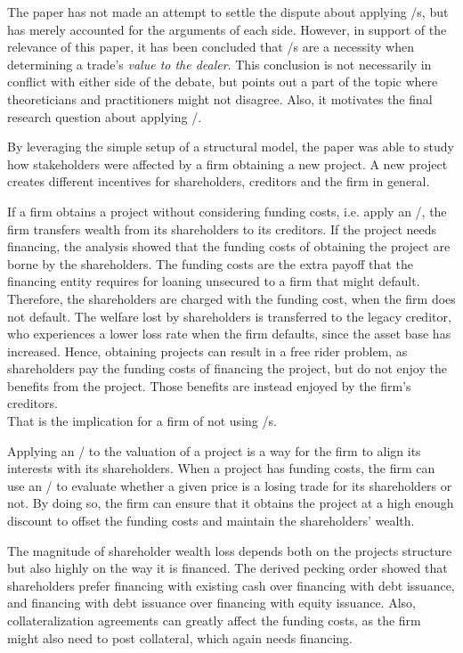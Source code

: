 \documentclass[main.tex]{subfiles}
\begin{document}
    The paper has not made an attempt to settle the dispute about applying \FVA/s,
    but has merely accounted for the arguments of each side.
    However, in support of the relevance of this paper,
    it has been concluded that \FVA/s are a necessity 
    when determining a trade's \textit{value to the dealer}.
    This conclusion is not necessarily in conflict with either side of the debate,
    but points out a part of the topic where theoreticians and practitioners might not disagree.
    Also, it motivates the final research question about applying \FVA/.

    \textbf{\researchQuestionFvaImplications}
    By leveraging the simple setup of a structural model,
    the paper was able to study how stakeholders were affected by a firm obtaining a new project.
    A new project creates different incentives for shareholders, creditors and the firm in general.

    If a firm obtains a project without considering funding costs, i.e. apply an \FVA/,
    the firm transfers wealth from its shareholders to its creditors.
    If the project needs financing, 
    the analysis showed that the funding costs 
    of obtaining the project are borne by the shareholders.
    The funding costs are the extra payoff that the financing entity requires
    for loaning unsecured to a firm that might default.
    Therefore, the shareholders are charged with the funding cost, when the firm does not default.
    The welfare lost by shareholders is transferred to the legacy creditor,
    who experiences a lower loss rate when the firm defaults, since the asset base has increased.
    Hence, obtaining projects can result in a free rider problem, 
    as shareholders pay the funding costs of financing the project,
    but do not enjoy the benefits from the project.
    Those benefits are instead enjoyed by the firm's creditors. \\
    That is the implication for a firm of not using \FVA/s.

    Applying an \FVA/ to the valuation of a project is a way for the firm 
    to align its interests with its shareholders.
    When a project has funding costs,
    the firm can use an \FVA/ to evaluate
    whether a given price is a losing trade for its shareholders or not.
    By doing so, the firm can ensure that it obtains the project at a high enough discount
    to offset the funding costs and maintain the shareholders' wealth.

    The magnitude of shareholder wealth loss depends both on the projects structure
    but also highly on the way it is financed. 
    The derived pecking order showed that shareholders prefer 
    financing with existing cash over financing with debt issuance, 
    and financing with debt issuance over financing with equity issuance.
    Also, collateralization agreements can greatly affect the funding costs,
    as the firm might also need to post collateral, which again needs financing.
\end{document}
